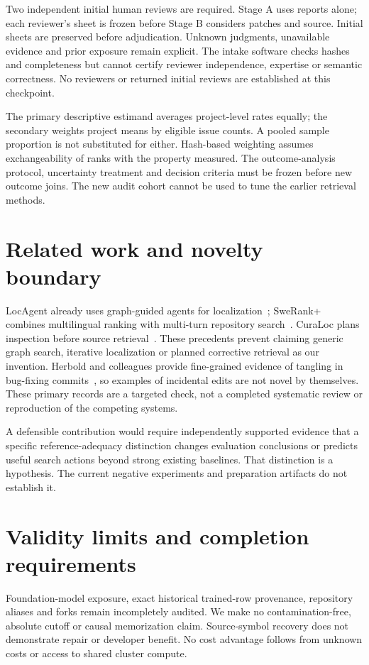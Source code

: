 \documentclass[11pt]{article}
\begin{document}
Two independent initial human reviews are required. Stage A uses reports alone; each
reviewer's sheet is frozen before Stage B considers patches and source. Initial sheets
are preserved before adjudication. Unknown judgments, unavailable evidence and prior
exposure remain explicit. The intake software checks hashes and completeness but cannot
certify reviewer independence, expertise or semantic correctness. No reviewers or returned
initial reviews are established at this checkpoint.

The primary descriptive estimand averages project-level rates equally; the secondary
weights project means by eligible issue counts. A pooled sample proportion is not
substituted for either. Hash-based weighting assumes exchangeability of ranks with the
property measured. The outcome-analysis protocol, uncertainty treatment and decision
criteria must be frozen before new outcome joins. The new audit cohort cannot be used to
tune the earlier retrieval methods.

\section{Related work and novelty boundary}
LocAgent already uses graph-guided agents for localization~\cite{locagent}; SweRank+
combines multilingual ranking with multi-turn repository search~\cite{swerankplus}.
CuraLoc plans inspection before source retrieval~\cite{curaloc}. These precedents prevent
claiming generic graph search, iterative localization or planned corrective retrieval as
our invention. Herbold and colleagues provide fine-grained evidence of tangling in
bug-fixing commits~\cite{tangling}, so examples of incidental edits are not novel by
themselves. These primary records are a targeted check, not a completed systematic review
or reproduction of the competing systems.

A defensible contribution would require independently supported evidence that a specific
reference-adequacy distinction changes evaluation conclusions or predicts useful search
actions beyond strong existing baselines. That distinction is a hypothesis. The current
negative experiments and preparation artifacts do not establish it.

\section{Validity limits and completion requirements}
Foundation-model exposure, exact historical trained-row provenance, repository aliases
and forks remain incompletely audited. We make no contamination-free, absolute cutoff or
causal memorization claim. Source-symbol recovery does not demonstrate repair or developer
benefit. No cost advantage follows from unknown costs or access to shared cluster compute.
\end{document}
